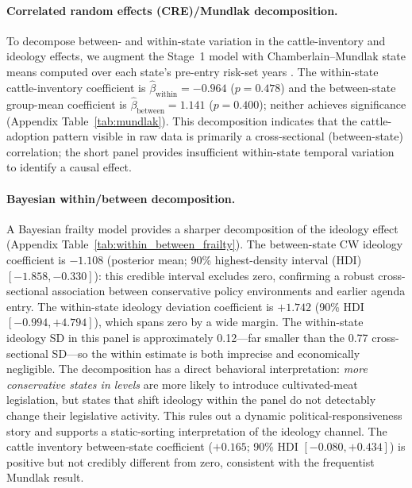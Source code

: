 \documentclass[12pt]{article}
\begin{document}
\paragraph{Correlated random effects (CRE)/Mundlak decomposition.}  To decompose between- and within-state variation in the cattle-inventory and ideology effects, we augment the Stage~1 model with Chamberlain--Mundlak state means computed over each state's pre-entry risk-set years \citep{mundlak1978pooling}.  The within-state cattle-inventory coefficient is $\hat{\beta}_{\text{within}} = -0.964$ ($p = 0.478$) and the between-state group-mean coefficient is $\hat{\beta}_{\text{between}} = 1.141$ ($p = 0.400$); neither achieves significance (Appendix Table~\ref{tab:mundlak}).  This decomposition indicates that the cattle-adoption pattern visible in raw data is primarily a cross-sectional (between-state) correlation; the short panel provides insufficient within-state temporal variation to identify a causal effect.

\paragraph{Bayesian within/between decomposition.}  A Bayesian frailty model provides a sharper decomposition of the ideology effect (Appendix Table~\ref{tab:within_between_frailty}).  The between-state CW ideology coefficient is $-1.108$ (posterior mean; 90\% highest-density interval (HDI) $[-1.858, -0.330]$): this credible interval excludes zero, confirming a robust cross-sectional association between conservative policy environments and earlier agenda entry.  The within-state ideology deviation coefficient is $+1.742$ (90\% HDI $[-0.994, +4.794]$), which spans zero by a wide margin.  The within-state ideology SD in this panel is approximately 0.12---far smaller than the 0.77 cross-sectional SD---so the within estimate is both imprecise and economically negligible.  The decomposition has a direct behavioral interpretation: \emph{more conservative states in levels} are more likely to introduce cultivated-meat legislation, but states that shift ideology within the panel do not detectably change their legislative activity.  This rules out a dynamic political-responsiveness story and supports a static-sorting interpretation of the ideology channel.  The cattle inventory between-state coefficient ($+0.165$; 90\% HDI $[-0.080, +0.434]$) is positive but not credibly different from zero, consistent with the frequentist Mundlak result.
\end{document}

